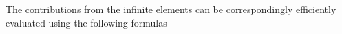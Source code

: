 The contributions from the infinite elements can be correspondingly efficiently evaluated using the following formulas
